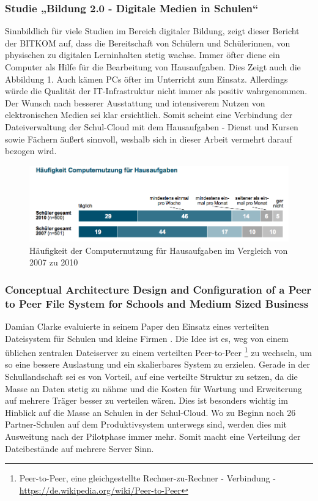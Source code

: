 \subsubsection{Studie „Bildung 2.0 - Digitale Medien in Schulen“}

Sinnbildlich für viele Studien im Bereich digitaler Bildung, zeigt dieser Bericht der BITKOM \cite{paper:studiebildung20} auf, dass die Bereitschaft von Schülern und Schülerinnen, von physischen zu digitalen Lerninhalten stetig wachse. Immer öfter diene ein Computer als Hilfe für die Bearbeitung von Hausaufgaben. Dies Zeigt auch die Abbildung 1. Auch kämen PCs öfter im Unterricht zum Einsatz. Allerdings würde die Qualität der IT-Infrastruktur nicht immer als positiv wahrgenommen. Der Wunsch nach besserer Ausstattung und intensiverem Nutzen von elektronischen Medien sei klar ersichtlich. Somit scheint eine Verbindung der Dateiverwaltung der Schul-Cloud mit dem Hausaufgaben - Dienst und Kursen sowie Fächern äußert sinnvoll, weshalb sich in dieser Arbeit vermehrt darauf bezogen wird.

\begin{figure}[H]
	\centering
	\includegraphics[width=0.8\linewidth]{images/BitkomNutzungComputerStudie}
	\caption[Caption for relatedWork]{Häufigkeit der Computernutzung für Hausaufgaben im Vergleich von 2007 zu 2010\footnotemark}
	\label{fig:BitkomNutzungComputerStudie}
\end{figure}

\subsubsection{Conceptual Architecture Design and Configuration of a Peer to Peer File System for Schools and Medium Sized Business}

Damian Clarke evaluierte in seinem Paper den Einsatz eines verteilten Dateisystem für Schulen und kleine Firmen \cite{paper:p2pfilesystemclarke}. Die Idee ist es, weg von einem üblichen zentralen Dateiserver zu einem verteilten Peer-to-Peer \footnote{Peer-to-Peer, eine gleichgestellte Rechner-zu-Rechner - Verbindung - \url{https://de.wikipedia.org/wiki/Peer-to-Peer}} zu wechseln, um so eine bessere Auslastung und ein skalierbares System zu erzielen. Gerade in der Schullandschaft sei es von Vorteil, auf eine verteilte Struktur zu setzen, da die Masse an Daten stetig zu nähme und die Kosten für Wartung und Erweiterung auf mehrere Träger besser zu verteilen wären. Dies ist besonders wichtig im Hinblick auf die Masse an Schulen in der Schul-Cloud. Wo zu Beginn noch 26 Partner-Schulen auf dem Produktivsystem unterwegs sind, werden dies mit Ausweitung nach der Pilotphase immer mehr. Somit macht eine Verteilung der Dateibestände auf mehrere Server Sinn.

